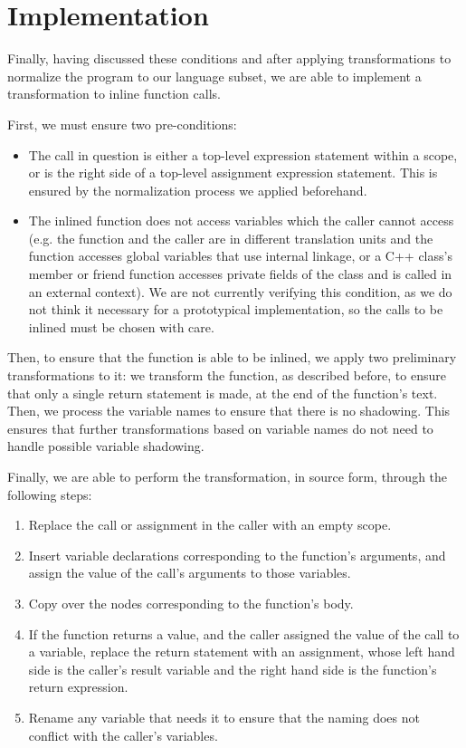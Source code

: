 \section{Implementation}\label{sec:inlining-impl}

Finally, having discussed these conditions and after applying transformations to normalize the program to our language subset, we are able to implement a transformation to inline function calls.

First, we must ensure two pre-conditions:

\begin{itemize}
    \item The call in question is either a top-level expression statement within a scope, or is the right side of a top-level assignment expression statement. This is ensured by the normalization process we applied beforehand.
    \item The inlined function does not access variables which the caller cannot access (e.g. the function and the caller are in different translation units and the function accesses global variables that use internal linkage, or a C++ class's member or friend function accesses private fields of the class and is called in an external context). We are not currently verifying this condition, as we do not think it necessary for a prototypical implementation, so the calls to be inlined must be chosen with care.
\end{itemize}

Then, to ensure that the function is able to be inlined, we apply two preliminary transformations to it: we transform the function, as described before, to ensure that only a single return statement is made, at the end of the function's text. Then, we process the variable names to ensure that there is no shadowing. This ensures that further transformations based on variable names do not need to handle possible variable shadowing.

Finally, we are able to perform the transformation, in source form, through the following steps:

\begin{enumerate}
    \item Replace the call or assignment in the caller with an empty scope.
    \item Insert variable declarations corresponding to the function's arguments, and assign the value of the call's arguments to those variables.
    \item Copy over the nodes corresponding to the function's body.
    \item If the function returns a value, and the caller assigned the value of the call to a variable, replace the return statement with an assignment, whose left hand side is the caller's result variable and the right hand side is the function's return expression.
    \item Rename any variable that needs it to ensure that the naming does not conflict with the caller's variables.
\end{enumerate}

